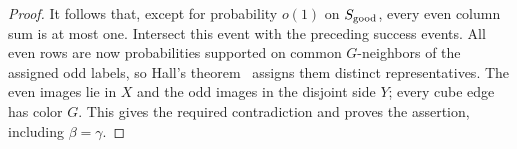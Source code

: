 \begin{proof}
It follows that, except for probability \(o(1)\) on \(S_{\rm good}\), every even
column sum is at most one. Intersect this event with the preceding
success events. All even rows are now probabilities supported on common
\(G\)-neighbors of the assigned odd labels, so Hall's
theorem~\cite{hall1935} assigns them distinct representatives. The even
images lie in \(X\) and the odd images in the disjoint side \(Y\);
every cube edge has color \(G\). This gives the required contradiction
and proves the assertion, including \(\beta=\gamma\).
\end{proof}
